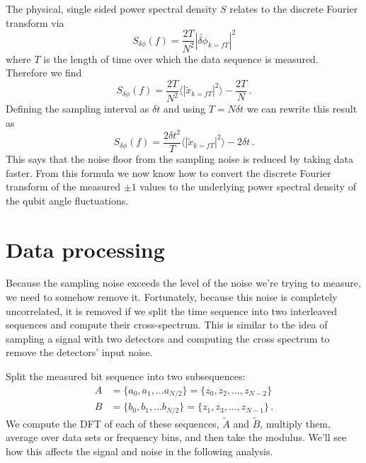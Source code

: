\documentclass[twocolumn]{article}
\begin{document}
The physical, single sided power spectral density $S$ relates to the discrete Fourier transform via
\begin{equation}
S_{\delta \phi}(f) = \frac{2T}{N^2} \left| \tilde{\delta \phi}_{k=fT} \right|^2
\end{equation}
where $T$ is the length of time over which the data sequence is measured.
Therefore we find
\begin{equation}
S_{\delta \phi}(f) = \frac{2T}{N^2} \langle \left| \tilde{x}_{k=fT} \right|^2 \rangle - \frac{2T}{N} \, .
\end{equation}
Defining the sampling interval as $\delta t$ and using $T = N \delta t$ we can rewrite this result as
\begin{equation}
S_{\delta \phi}(f) = \frac{2 \delta t^2}{T} \langle \left| \tilde{x}_{k=fT} \right|^2 \rangle - 2 \delta t \, .
\end{equation}
This says that the noise floor from the sampling noise is reduced by taking data faster.
From this formula we now know how to convert the discrete Fourier transform of the measured $\pm 1$ values to the underlying power spectral density of the qubit angle fluctuations.

% 

\section{Data processing}

Because the sampling noise exceeds the level of the noise we're trying to measure, we need to somehow remove it.
Fortunately, because this noise is completely uncorrelated, it is removed if we split the time sequence into two interleaved sequences and compute their cross-spectrum.
This is similar to the idea of sampling a signal with two detectors and computing the cross spectrum to remove the detectors' input noise.

Split the measured bit sequence into two subsequences:
\begin{align}
A &= \{ a_0, a_1, \ldots a_{N/2} \} = \{z_0, z_2, \ldots, z_{N-2} \} \nonumber \\
B &= \{ b_0, b_1, \ldots b_{N/2} \} = \{z_1, z_3, \ldots, z_{N-1} \} \, .
\end{align}
We compute the DFT of each of these sequences, $\tilde{A}$ and $\tilde{B}$, multiply them, average over data sets or frequency bins, and then take the modulus.
We'll see how this affects the signal and noise in the following analysis.
\end{document}

